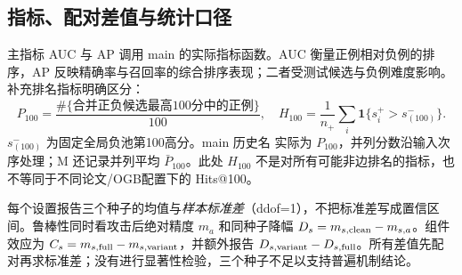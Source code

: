\subsection{指标、配对差值与统计口径}
主指标 AUC 与 AP 调用 main 的实际指标函数。AUC 衡量正例相对负例的排序，AP 反映精确率与召回率的综合排序表现；二者受测试候选与负例难度影响。补充排名指标明确区分：
\begin{equation}
 P_{100}=\frac{\#\{\text{合并正负候选最高100分中的正例}\}}{100},\quad
 H_{100}=\frac1{n_+}\sum_i\mathbf1\{s_i^+>s^-_{(100)}\}.
\end{equation}
$s^-_{(100)}$ 为固定全局负池第100高分。main 历史名  实际为 $P_{100}$，并列分数沿输入次序处理；M 还记录并列平均 $\bar P_{100}$。此处 $H_{100}$ 不是对所有可能非边排名的指标，也不等同于不同论文/OGB配置下的 Hits@100。

每个设置报告三个种子的均值与\emph{样本标准差}（ddof=1），不把标准差写成置信区间。鲁棒性同时看攻击后绝对精度 $m_a$ 和同种子降幅 $D_s=m_{s,\rm clean}-m_{s,a}$。组件效应为 $C_s=m_{s,\rm full}-m_{s,\rm variant}$，并额外报告 $D_{s,\rm variant}-D_{s,\rm full}$。所有差值先配对再求标准差；没有进行显著性检验，三个种子不足以支持普遍机制结论。
